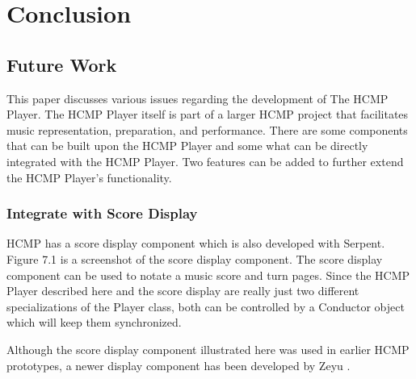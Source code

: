 
\chapter{Conclusion} %



\ifpdf
    \graphicspath{{X/figures/PNG/}{X/figures/PDF/}{X/figures/}}
\else
    \graphicspath{{X/figures/EPS/}{X/figures/}}
\fi


\section{Future Work}

This paper discusses various issues regarding the development of 
The HCMP Player. The HCMP Player itself is part of a larger HCMP project 
that facilitates music representation, preparation, and performance.
There are some components that can be built upon the HCMP Player and some 
what can be directly integrated with the HCMP Player. Two
features can be added to further extend the HCMP Player's functionality. 

\subsection{Integrate with Score Display}
HCMP has a score display component which is also developed with Serpent.
Figure 7.1 is a screenshot of the score display component. The score 
display component can be used to notate a music score and turn
pages. Since the HCMP Player described here and the score display 
are really just two different specializations of the Player class,
both can be controlled by a Conductor object which will keep them synchronized.

Although the score display component illustrated here was used in earlier 
HCMP prototypes, a newer display component has been developed by Zeyu 
\cite{Zeyu:2013}.


